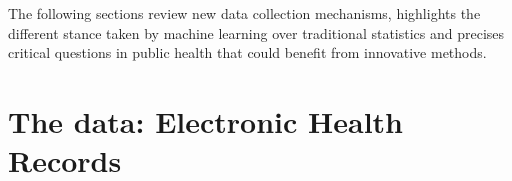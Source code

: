\documentclass[french,12pt,twoside,a4paper]{book}
\begin{document}

The following sections review new data collection mechanisms,
highlights the different stance taken by machine learning over traditional
statistics and precises critical questions in public health that could
benefit from innovative methods.

\pagebreak
\section{The data: Electronic Health Records}\label{sec:intro:data}
\end{document}
